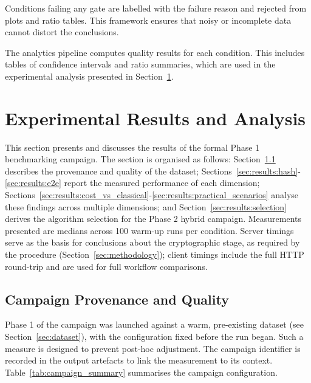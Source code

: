 \documentclass[12pt,a4paper]{article}
\begin{document}
Conditions failing any gate are labelled with the failure reason and rejected from plots and ratio tables. This framework ensures that noisy or incomplete data cannot distort the conclusions.

The analytics pipeline computes quality results for each condition. This includes tables of confidence intervals and ratio summaries, which are used in the experimental analysis presented in Section~\ref{sec:results}.

\newpage
\section{Experimental Results and Analysis}
\label{sec:results}

This section presents and discusses the results of the formal Phase 1 benchmarking campaign. The section is organised as follows: Section~\ref{sec:results:campaign} describes the provenance and quality of the dataset; Sections~\ref{sec:results:hash}-\ref{sec:results:e2e} report the measured performance of each dimension; Sections~\ref{sec:results:cost_vs_classical}-\ref{sec:results:practical_scenarios} analyse these findings across multiple dimensions; and Section~\ref{sec:results:selection} derives the algorithm selection for the Phase 2 hybrid campaign. Measurements presented are medians across 100 warm-up runs per condition. Server timings serve as the basis for conclusions about the cryptographic stage, as required by the procedure (Section~\ref{sec:methodology}); client timings include the full HTTP round-trip and are used for full workflow comparisons.

\subsection{Campaign Provenance and Quality}
\label{sec:results:campaign}

Phase 1 of the campaign was launched against a warm, pre-existing dataset (see Section~\ref{sec:dataset}), with the configuration fixed before the run began. Such a measure is designed to prevent post-hoc adjustment. The campaign identifier is recorded in the output artefacts to link the measurement to its context.
Table~\ref{tab:campaign_summary} summarises the campaign configuration.
\end{document}
